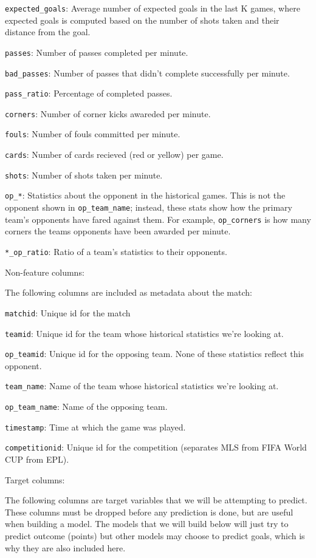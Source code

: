 \documentclass[12pt,fleqn]{article}\usepackage{common}
\begin{document}
\verb!expected_goals!: Average number of expected goals in the last K
games, where expected goals is computed based on the number of shots taken
and their distance from the goal.

\verb!passes!: Number of passes completed per minute.

\verb!bad_passes!: Number of passes that didn't complete successfully per
minute.

\verb!pass_ratio!: Percentage of completed passes.

\verb!corners!: Number of corner kicks awareded per minute.

\verb!fouls!: Number of fouls committed per minute.

\verb!cards!: Number of cards recieved (red or yellow) per game.

\verb!shots!: Number of shots taken per minute.

\verb!op_*!: Statistics about the opponent in the historical games. This is
not the opponent shown in \verb!op_team_name!; instead, these stats show
how the primary team's opponents have fared against them. For example,
\verb!op_corners! is how many corners the teams opponents have been awarded
per minute.

\verb!*_op_ratio!: Ratio of a team's statistics to their opponents.

Non-feature columns:

The following columns are included as metadata about the match:

\verb!matchid!: Unique id for the match

\verb!teamid!: Unique id for the team whose historical statistics we're looking at.

\verb!op_teamid!: Unique id for the opposing team. None of these statistics
reflect this opponent.

\verb!team_name!: Name of the team whose historical statistics we're looking at.

\verb!op_team_name!: Name of the opposing team.

\verb!timestamp!: Time at which the game was played.

\verb!competitionid!: Unique id for the competition (separates MLS from FIFA World CUP from EPL).

Target columns:

The following columns are target variables that we will be attempting to
predict. These columns must be dropped before any prediction is done, but
are useful when building a model. The models that we will build below will
just try to predict outcome (points) but other models may choose to predict
goals, which is why they are also included here.
\end{document}
